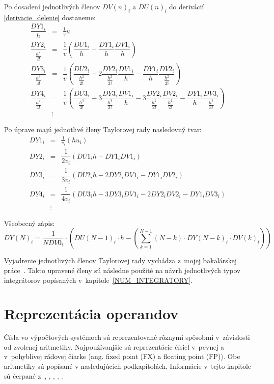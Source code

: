 Po dosadení jednotlivých členov $ DV(n)_{i} $ a $ DU(n)_{i} $ do derivácií \eqref{derivacie_delenie} dostaneme:
\begin{eqnarray}
\dfrac{DY1_{i}}{h} & = & \frac{1}{v} u~\\
\dfrac{DY2_{i}}{\frac{h^{2}}{2!}} & = & \dfrac{1}{v} ( \dfrac{DU1_{i}}{h} - \dfrac{DY1_{i}}{h}\dfrac{DV1_{i}}{h} ) \nonumber \\
\dfrac{DY3_{i}}{\frac{h^{3}}{3!}} & = & \dfrac{1}{v} 
( \dfrac{DU2_{i}}{\frac{h^{2}}{2!}} - 
2\dfrac{DY2_{i}}{\frac{h^{2}}{2!}} \dfrac{DV1_{i}}{h} - 
\dfrac{DY1_{i}}{h} \dfrac{DV2_{i}}{\frac{h^{2}}{2!}} ) \nonumber \\
\dfrac{DY4_{i}}{\frac{h^{4}}{4!}} & = & \dfrac{1}{v} 
( \dfrac{DU3_{i}}{\frac{h^{3}}{3!}} - 
3\dfrac{DY3_{i}}{\frac{h^{3}}{3!}} \dfrac{DV1_{i}}{h} - 
3\dfrac{DY2_{i}}{\frac{h^{2}}{2!}} \dfrac{DV2_{i}}{\frac{h^{2}}{2!}} -
\dfrac{DY1_{i}}{h} \dfrac{DV3_{i}}{\frac{h^{3}}{3!}} ) \nonumber \\
& \vdots \nonumber & 
\end{eqnarray}


Po úprave majú jednotlivé členy Taylorovej rady nasledovný tvar:
\begin{eqnarray}
DY1_{i} & = & \frac{1}{v_{i}} (hu_{i}) \label{DY1_cleny_delenia} \\
DY2_{i} & = & \dfrac{1}{2v_{i}} (DU1_{i}h - DY1_{i}DV1_{i}) \label{DY2_cleny_delenia} \\
DY3_{i} & = & \dfrac{1}{3v_{i}} ( DU2_{i}h - 2DY2_{i}DV1_{i} - DY1_{i}DV2_{i} ) \label{DY3_cleny_delenia} \\
DY4_{i} & = & \dfrac{1}{4v_{i}} ( DU3_{i}h - 3DY3_{i}DV1_{i} - 2DY2_{i}DV2_{i} - DY1_{i}DV3_{i} ) \label{DY4_cleny_delenia} \\ 
& \vdots \nonumber & 
\end{eqnarray}

Všeobecný zápis:
\begin{equation}
DY(N)_{i} = \dfrac{1}{N DV0_{i}} \cdot \left( DU(N-1)_{i} \cdot h - \left( \sum_{k=1}^{N-1} (N-k) \cdot DY(N-k)_{i} \cdot DV(k)_{i} \right) \right) \label{suma_div}
\end{equation}
\bigskip

Vyjadrenie jednotlivých členov Taylorovej rady vychádza z~mojej bakalárskej práce~\cite{MatecnyBP}. Takto upravené členy sú následne použité na návrh jednotlivých typov integrátorov popísaných v~kapitole~\ref{NUM_INTEGRATORY}.



\chapter{Reprezentácia operandov} \label{REPREZENTACIA_OPERANDOV}
Čísla vo výpočtových systémoch sú reprezentované rôznymi spôsobmi v~závislosti od zvolenej aritmetiky. Najpoužívanjšie sú reprezentácie čísiel v~pevnej a v~pohyblivej rádovej čiarke (ang. fixed point (FX) a floating point (FP)). Obe aritmetiky sú popísané v nasledujúcich podkapitolách. Informácie v~tejto kapitole sú čerpané z~\cite{FXOnline}, \cite{FPOnline}, \cite{KrausDisP}, \cite{inpFP}, \cite{inpRepDat}.


